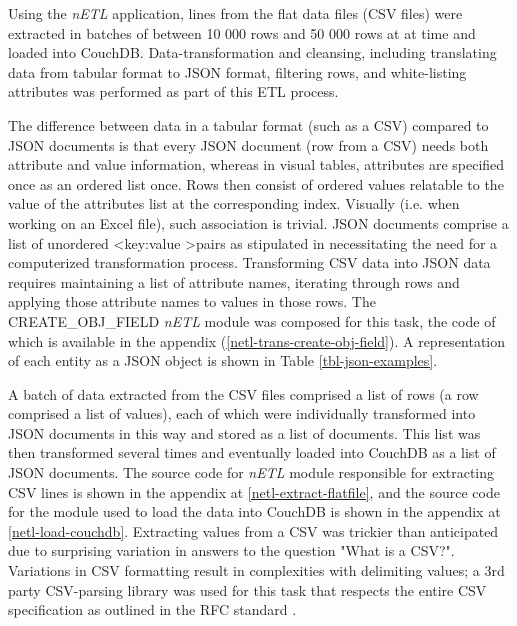 Using the \textit{nETL} application, lines from the flat data files (CSV files) were extracted in batches of between 10 000 rows and 50 000 rows at at time and loaded into CouchDB. Data-transformation and cleansing, including translating data from tabular format to JSON format, filtering rows, and white-listing attributes was performed as part of this ETL process.

The difference between data in a tabular format (such as a CSV) compared to JSON documents is that every JSON document (row from a CSV) needs both attribute and value information, whereas in visual tables, attributes are specified once as an ordered list once. Rows then consist of ordered values relatable to the value of the attributes list at the corresponding index. Visually (i.e. when working on an Excel file), such association is trivial. JSON documents comprise a list of unordered \textless key:value \textgreater pairs as stipulated in \cite{rfc7159} necessitating the need for a computerized transformation process. Transforming CSV data into JSON data requires maintaining a list of attribute names, iterating through rows and applying those attribute names to values in those rows. The CREATE\_OBJ\_FIELD \textit{nETL} module was composed for this task, the code of which is available in the appendix (\ref{netl-trans-create-obj-field}). A representation of each entity as a JSON object is shown in Table \ref{tbl-json-examples}.



A batch of data extracted from the CSV files comprised a list of rows (a row comprised a list of values), each of which were individually transformed into JSON documents in this way and stored as a list of documents. This list was then transformed several times and eventually loaded into CouchDB as a list of JSON documents. The source code for \textit{nETL} module responsible for extracting CSV lines is shown in the appendix at \ref{netl-extract-flatfile}, and the source code for the module used to load the data into CouchDB is shown in the appendix at \ref{netl-load-couchdb}. Extracting values from a CSV was trickier than anticipated due to surprising variation in answers to the question "What is a CSV?". Variations in CSV formatting result in complexities with delimiting values; a 3rd party CSV-parsing library was used for this task that respects the entire CSV specification as outlined in the RFC standard \cite{rfc4180}.

